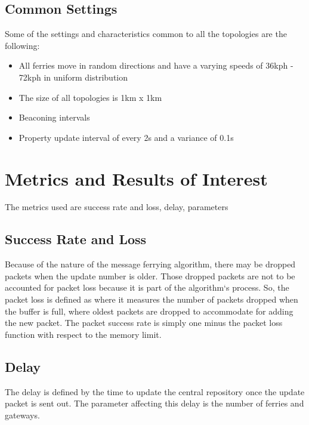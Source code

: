 \subsection{Common Settings}
\label{sec:commonsettings}
Some of the settings and characteristics common to all the topologies are the following:
	\begin{itemize}
	\item All ferries move in random directions and have a varying speeds of 36kph - 72kph in uniform distribution 
	\item The size of all topologies is 1km x 1km
	\item Beaconing intervals  %
	\item Property update interval of every 2s and a variance of 0.1s
	\end{itemize}


\section{Metrics and Results of Interest }
\label{sec:metrics}

The metrics used are success rate and loss, delay, parameters  %

\subsection{Success Rate and Loss}
\label{sec:packetloss}
Because of the nature of the message ferrying algorithm, there may be dropped packets when the update number is older.
Those dropped packets are not to be accounted for packet loss because it is part of the algorithm`s process.
So, the packet loss is defined as where it measures the number of packets dropped when the buffer is full, where oldest packets are dropped to accommodate for adding the new packet.
The packet success rate is simply one minus the packet loss function with respect to the memory limit.


\subsection{Delay}
\label{sec:delay}
The delay is defined by the time to update the central repository once the update packet is sent out.  
The parameter affecting this delay is the number of ferries and gateways.

